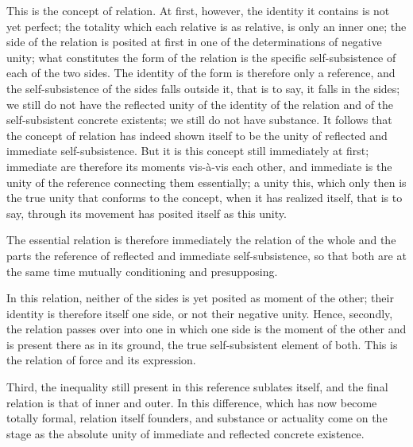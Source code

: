 This is the concept of relation.
At first, however, the identity it contains
is not yet perfect;
the totality which each relative is as relative,
is only an inner one;
the side of the relation is posited at first
in one of the determinations of negative unity;
what constitutes the form of the relation is
the specific self-subsistence of each of the two sides.
The identity of the form is therefore only a reference,
and the self-subsistence of the sides falls outside it,
that is to say, it falls in the sides;
we still do not have the reflected unity
of the identity of the relation
and of the self-subsistent concrete existents;
we still do not have substance.
It follows that the concept of relation has
indeed shown itself to be the unity
of reflected and immediate self-subsistence.
But it is this concept still immediately at first;
immediate are therefore its moments vis-à-vis each other,
and immediate is the unity of the reference
connecting them essentially;
a unity this, which only then is the true unity
that conforms to the concept,
when it has realized itself, that is to say,
through its movement has posited itself as this unity.

The essential relation is therefore immediately
the relation of the whole and the parts
the reference of reflected and immediate self-subsistence,
so that both are at the same time
mutually conditioning and presupposing.

In this relation, neither of the sides is
yet posited as moment of the other;
their identity is therefore itself one side,
or not their negative unity.
Hence, secondly, the relation passes over into one
in which one side is the moment of the other
and is present there as in its ground,
the true self-subsistent element of both.
This is the relation of force and its expression.

Third, the inequality still present
in this reference sublates itself,
and the final relation is that of inner and outer.
In this difference,
which has now become totally formal,
relation itself founders,
and substance or actuality come on the stage
as the absolute unity of
immediate and reflected concrete existence.
